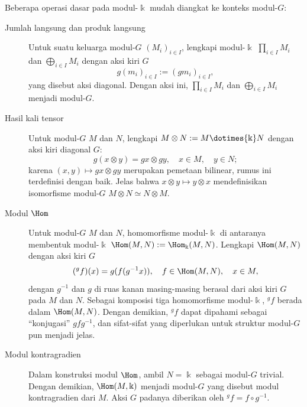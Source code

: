 Beberapa operasi dasar pada modul-$\Bbbk$ mudah diangkat ke konteks modul-$G$:
\begin{description}
	\item[Jumlah langsung dan produk langsung] Untuk suatu keluarga modul-$G$
	$(M_i)_{i\in I}$, lengkapi modul-$\Bbbk$ $\prod_{i\in I}M_i$ dan
	$\bigoplus_{i\in I}M_i$ dengan aksi kiri $G$
	\[ g (m_i)_{i \in I} := (gm_i)_{i \in I}, \]
	yang disebut aksi diagonal. Dengan aksi ini, $\prod_{i\in I}M_i$ dan
	$\bigoplus_{i\in I}M_i$ menjadi modul-$G$.
	\item[Hasil kali tensor] Untuk modul-$G$ $M$ dan $N$, lengkapi
	$M\otimes N:=M\dotimes{\Bbbk}N$ dengan aksi kiri diagonal $G$:
	\[ g (x \otimes y) = gx \otimes gy, \quad x \in M, \quad y \in N ; \]
	karena $(x,y)\mapsto gx\otimes gy$ merupakan pemetaan bilinear, rumus ini
	terdefinisi dengan baik. Jelas bahwa
	$x\otimes y\mapsto y\otimes x$ mendefinisikan isomorfisme modul-$G$
	$M\otimes N\simeq N\otimes M$.
	\item[Modul $\Hom$] Untuk modul-$G$ $M$ dan $N$, homomorfisme
	modul-$\Bbbk$ di antaranya membentuk modul-$\Bbbk$
	$\Hom(M,N):=\Hom_{\Bbbk}(M,N)$. Lengkapi $\Hom(M,N)$ dengan aksi kiri $G$
	\[ ({}^g f)(x) = g(f(g^{-1} x)), \quad f \in \Hom(M, N), \quad x \in M, \]
	dengan $g^{-1}$ dan $g$ di ruas kanan masing-masing berasal dari aksi kiri
	$G$ pada $M$ dan $N$. Sebagai komposisi tiga homomorfisme modul-$\Bbbk$,
	${}^gf$ berada dalam $\Hom(M,N)$. Dengan demikian, ${}^gf$ dapat dipahami
	sebagai ``konjugasi'' $gfg^{-1}$, dan sifat-sifat yang diperlukan untuk
	struktur modul-$G$ pun menjadi jelas.

	\item[Modul kontragradien] Dalam konstruksi modul $\Hom$, ambil
	$N=\Bbbk$ sebagai modul-$G$ trivial. Dengan demikian, $\Hom(M,\Bbbk)$
	menjadi modul-$G$ yang disebut modul kontragradien dari $M$. Aksi $G$ padanya
	diberikan oleh ${}^gf=f\circ g^{-1}$.
\end{description}

